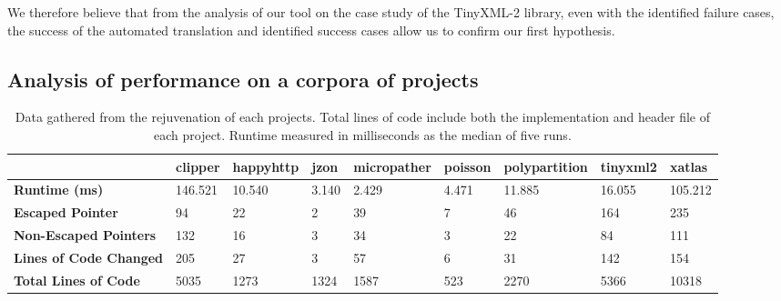 \documentclass{mpaper}
\begin{document}
    We therefore believe that from the analysis of our tool on the case study of the TinyXML-2 library, even with the identified failure cases, the success of the automated translation and identified success cases allow us to confirm our first hypothesis.
    
    \subsection{Analysis of performance on a corpora of projects}
    
        \begin{table}
    \begin{tabular}{|l|l|l|l|l|l|l|l|l|}
    \hline
                                   & \textbf{clipper} & \textbf{happyhttp} & \textbf{jzon} & \textbf{micropather} & \textbf{poisson} & \textbf{polypartition} & \textbf{tinyxml2} & \textbf{xatlas} \\ \hline \hline
    \textbf{Runtime (ms)}          & 146.521          & 10.540             & 3.140                & 2.429         & 4.471            & 11.885                 & 16.055            & 105.212         \\ \hline
    \textbf{Escaped Pointer}       & 94               & 22                 & 2                    & 39            & 7                & 46                     & 164               & 235             \\ \hline
    \textbf{Non-Escaped Pointers}  & 132              & 16                 & 3                    & 34            & 3                & 22                     & 84                & 111             \\ \hline
    \textbf{Lines of Code Changed}   & 205             & 27                 & 3                    & 57            & 6                & 31                     & 142               & 154             \\ \hline
    \textbf{Total Lines of Code} & 5035             & 1273               & 1324                 & 1587          & 523              & 2270                   & 5366              & 10318           \\ \hline
    \end{tabular}    
    \caption{Data gathered from the rejuvenation of each projects. Total lines of code include both the implementation and header file of each project. Runtime measured in milliseconds as the median of five runs.}
    \label{table:data}
    \end{table}
    
\end{document}
